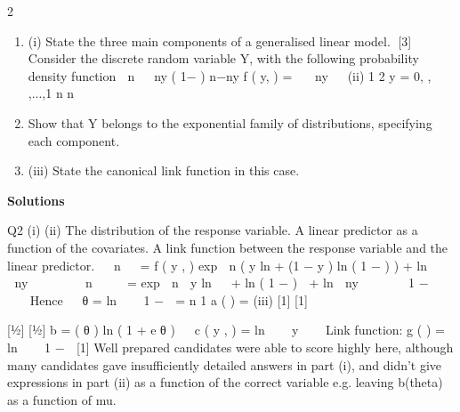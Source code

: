 \documentclass[a4paper,12pt]{article}
\begin{document}
 

2
\begin{enumerate}
\item (i)
State the three main components of a generalised linear model.
[3]
Consider the discrete random variable Y, with the following probability density
function
⎛ n ⎞
⎟ \mu ny ( 1− \mu ) n−ny
f ( y, \mu ) = ⎜⎜
⎟
ny
⎝
⎠
(ii)
1 2
y = 0, , ,...,1
n n
\item Show that Y belongs to the exponential family of distributions, specifying each
component.
\item (iii)
State the canonical link function in this case.
\end{enumerate}
\newpage 
\noindent \textbf{Solutions}

Q2
(i)
(ii)
The distribution of the response variable.
A linear predictor as a function of the covariates.
A link function between the response variable and the linear predictor.

 n  
=
f ( y , \mu ) exp  n ( y ln \mu + (1 − y ) ln ( 1 − \mu ) ) + ln   
 ny  

 

 n  
 \mu 
= exp  n  y ln 
 + ln ( 1 − \mu )  + ln  ny  
  
 1 − \mu 
   

Hence
 \mu 
θ = ln 

 1 − \mu 
\phi  = n
1
a ( \phi  ) =
\phi 
(iii)
[1]
[1]

[1⁄2]
[1⁄2]
b =
( θ ) ln ( 1 + e θ )
 \phi  
c ( y , \phi  ) = ln  
 \phi  y 
 \mu 
Link function: g ( \mu ) = ln 

 1 − \mu  [1]
Well prepared candidates were able to score highly here, although many candidates gave
insufficiently detailed answers in part (i), and didn’t give expressions in part (ii) as a function
of the correct variable e.g. leaving b(theta) as a function of mu.
\end{document}
